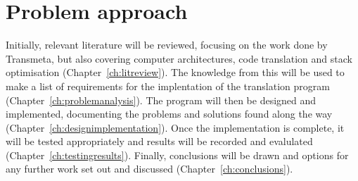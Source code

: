 \section{Problem approach}
Initially, relevant literature will be reviewed, focusing on the work done by
Transmeta, but also covering computer architectures, code translation and stack
optimisation (Chapter~\ref{ch:litreview}). The knowledge from this will be used
to make a list of requirements for the implentation of the translation program
(Chapter~\ref{ch:problemanalysis}). The program will then be designed and
implemented, documenting the problems and solutions found along the way
(Chapter~\ref{ch:designimplementation}). Once the implementation is complete, it
will be tested appropriately and results will be recorded and evalulated
(Chapter~\ref{ch:testingresults}). Finally, conclusions will be drawn and
options for any further work set out and discussed
(Chapter~\ref{ch:conclusions}).

